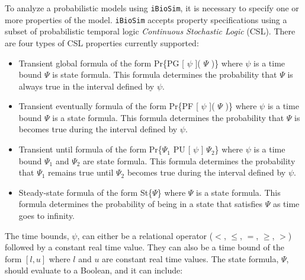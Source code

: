 \documentclass[titlepage,11pt]{article}
\begin{document}
\noindent
To analyze a probabilistic models using {\tt iBioSim}, it is necessary to specify one or more properties of
the model.  {\tt iBioSim} accepts property specifications using a subset of probabilistic temporal logic \emph{Continuous Stochastic Logic} (CSL).  There are four types of CSL properties currently supported:
\begin{itemize}
\item Transient global formula of the form Pr\{PG [ $\psi$ ]( $\Psi$ )\} where $\psi$ is a time bound $\Psi$ is state formula.  This formula determines the probability that $\Psi$ is always true in the interval defined by $\psi$.
\item Transient eventually formula of the form Pr\{PF [ $\psi$ ]( $\Psi$ )\} where $\psi$ is a time bound $\Psi$ is a state formula.  This formula determines the probability that $\Psi$ is becomes true during the interval defined by $\psi$.
\item Transient until formula of the form Pr\{$\Psi_1$ PU [ $\psi$ ] $\Psi_2$\} where $\psi$ is a time bound $\Psi_1$ and $\Psi_2$ are state formula.  This formula determines the probability that $\Psi_1$ remains true until $\Psi_2$ becomes true during the interval defined by $\psi$.
\item Steady-state formula of the form St\{$\Psi$\} where $\Psi$ is a state formula.  This formula determines the probability of being in a state that satisfies $\Psi$ as time goes to infinity.
\end{itemize}
The time bounds, $\psi$, can either be a relational operator ($<$, $\leq$, $=$, $\geq$, $>$) followed by a constant real time value.  They can also be a time bound of the form $[ l, u ]$ where $l$ and $u$
are constant real time values.  The state formula, $\Psi$, should evaluate to a Boolean, and it can include:
\end{document}
